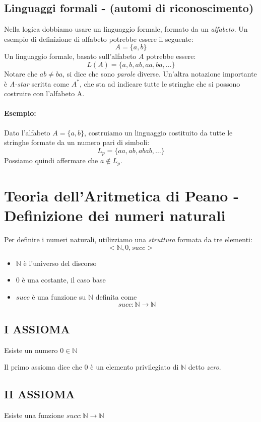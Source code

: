\documentclass[a4paper,12pt]{report}
\begin{document}
\subsection{Linguaggi formali - (automi di riconoscimento)}

Nella logica dobbiamo usare un linguaggio formale, formato da un \emph{alfabeto}. Un esempio di definizione di alfabeto potrebbe essere il seguente:
\[ A = \{a, b\} \]
Un linguaggio formale, basato sull'alfabeto $A$ potrebbe essere:
\[ L(A) = \{a, b, ab, aa, ba, \dots \} \]
Notare che $ab \ne ba$, si dice che sono \emph{parole} diverse.
Un'altra notazione importante \`{e} \emph{A-star} scritta come $A^{*}$, che sta ad indicare tutte le stringhe che si possono costruire con l'alfabeto A.
\paragraph{Esempio:}

Dato l'alfabeto $A = \{a, b\}$, costruiamo un linguaggio costituito da tutte le stringhe formate da un numero pari di simboli:
\[ L_p = \{aa, ab, abab, \dots\} \]
Possiamo quindi affermare che $a \notin L_p$.


\section{Teoria dell'Aritmetica di Peano - Definizione dei numeri naturali}

Per definire i numeri naturali, utilizziamo una \emph{struttura} formata da tre elementi:
\[ <\mathbb{N}, 0, succ> \]
\begin{itemize}
\item $\mathbb{N}$ \`{e} l'universo del discorso
\item $0$ \`{e} una costante, il caso base
\item $succ$ \`{e} una funzione su $\mathbb{N}$ definita come \[ succ: \mathbb{N} \rightarrow \mathbb{N} \]
\end{itemize}

\subsection{I ASSIOMA}

\begin{center} Esiste un numero $0 \in \mathbb{N}$ \end{center}
Il primo assioma dice che $0$ \`{e} un elemento privilegiato di $\mathbb{N}$ detto \emph{zero}.

\subsection{II ASSIOMA}
\begin{center} Esiste una funzione $succ:  \mathbb{N} \rightarrow \mathbb{N}$ \end{center}
\end{document}
